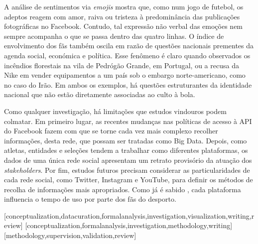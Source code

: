 \documentclass{textolivre}
\begin{document}
A análise de sentimentos via \emph{emojis} mostra que, como num jogo de futebol, os adeptos reagem com amor, raiva ou tristeza à predominância das publicações fotográficas no Facebook. Contudo, tal expressão não verbal das emoções \cite{novak2015} nem sempre acompanha o que se passa dentro das quatro linhas. O índice de envolvimento dos fãs também oscila em razão de questões nacionais prementes da agenda social, económica e política. Esse fenômeno é claro quando observados os incêndios florestais na vila de Pedrógão Grande, em Portugal, ou a recusa da Nike em vender equipamentos a um país sob o embargo norte-americano, como no caso do Irão. Em ambos os exemplos, há questões estruturantes da identidade nacional que não estão diretamente associadas ao culto à bola.

Como qualquer investigação, há limitações que estudos vindouros podem colmatar. Em primeiro lugar, as recentes mudanças nas políticas de acesso à API do Facebook fazem com que se torne cada vez mais complexo recolher informações, desta rede, que possam ser tratadas como Big Data. Depois, como atletas, entidades e seleções tendem a trabalhar como diferentes plataformas, os dados de uma única rede social apresentam um retrato provisório da atuação dos \emph{stakeholders}. Por fim, estudos futuros precisam considerar as particularidades de cada rede social, como Twitter, Instagram e YouTube, para definir os métodos de recolha de informações mais apropriados. Como já é sabido \cite{ahn2014}, cada plataforma influencia o tempo de uso por parte dos fãs do desporto.




\printbibliography\label{sec-bib}

\begin{contributors}
[conceptualization,datacuration,formalanalysis,investigation,visualization,writing,review]
[conceptualization,formalanalysis,investigation,methodology,writing]
[methodology,supervision,validation,review]
\end{contributors}
\end{document}
